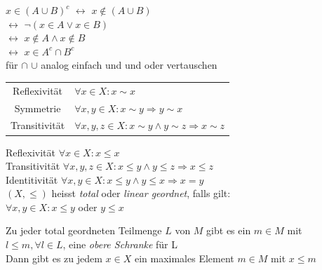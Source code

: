 \documentclass[a4paper]{article}
\begin{document}

\begin{multicols}{2}
	\begin{fmerke}
			$x \in (A \cup B)^c$  $\leftrightarrow$  $x \notin (A \cup B)$\\
								$\leftrightarrow$  $\neg (x \in A \lor x \in
			B)$\\
								$\leftrightarrow$  $x \notin A \land x \notin
			B$\\
								$\leftrightarrow$  $x \in A^c \cap
								B^c$\\
			für $\cap$ $\cup$ analog einfach und und oder vertauschen
	\end{fmerke}

	\begin{fdef}[Äquivalenzrelation]
		\begin{tabular}{c l}
			Reflexivität  & $\forall x \in X: x \sim x$\\
			Symmetrie     & $\forall x, y \in X: x \sim y \Rightarrow y \sim
			x$\\
			Transitivität &$\forall x, y, z \in X: x \sim y \land y\sim z \Rightarrow x \sim z$
		\end{tabular}
	\end{fdef}

	\begin{fmerke}[Ordnungsrelation]
			Reflexivität   $\forall x \in X: x \le x$\\
			Transitivität  $\forall x,y,z \in X: x\le y \land y \le z \Rightarrow x \le
			z$\\
			Identitivität  $\forall x,y \in X: x\le y \land y \le x \Rightarrow x =
			y$\\
			$(X, \le)$ heisst \textit{total} oder \textit{linear
			geordnet}, falls gilt:\\ $\forall x,y\in X: x\le y$ oder $y \le x$
	\end{fmerke}


	\begin{fsatz}
		Zu jeder total geordneten Teilmenge $L$ von $M$ gibt es ein $m \in
		M$ mit $l \le m, \forall l \in L$, eine \textit{obere
		Schranke} für L\\
		Dann gibt es zu jedem $x \in X$ ein maximales Element $m \in
		M$ mit $x \le m$
	\end{fsatz}

\end{multicols}
\end{document}
